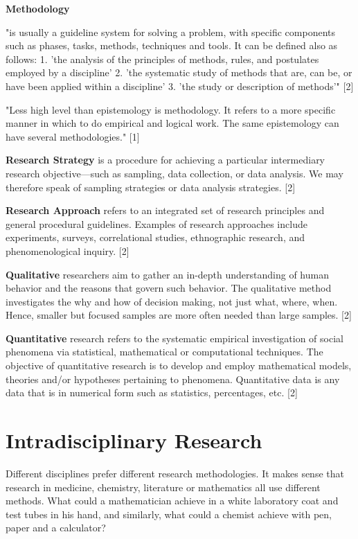 \textbf{Methodology}

"is usually a guideline system for solving a problem, with specific components such as phases, tasks, methods, techniques and tools. It can be defined also as follows: 1.	'the analysis of the principles of methods, rules, and postulates employed by a discipline' 2.	'the systematic study of methods that are, can be, or have been applied within a discipline' 3.	'the study or description of methods'" [2]

"Less high level than epistemology is methodology. It refers to a more specific manner in which to do empirical and logical work. The same epistemology can have several methodologies." [1]

\textbf{Research Strategy}
is a procedure for achieving a particular intermediary research objective—such as sampling, data collection, or data analysis. We may therefore speak of sampling strategies or data analysis strategies. [2]

\textbf{Research Approach}
refers to an integrated set of research principles and general procedural guidelines. Examples of research approaches include experiments, surveys, correlational studies, ethnographic research, and phenomenological inquiry. [2]

\textbf{Qualitative}
researchers aim to gather an in-depth understanding of human behavior and the reasons that govern such behavior. The qualitative method investigates the why and how of decision making, not just what, where, when. Hence, smaller but focused samples are more often needed than large samples. [2]

\textbf{Quantitative}
research refers to the systematic empirical investigation of social phenomena via statistical, mathematical or computational techniques. The objective of quantitative research is to develop and employ mathematical models, theories and/or hypotheses pertaining to phenomena. Quantitative data is any data that is in numerical form such as statistics, percentages, etc. [2]


\section{Intradisciplinary Research}

Different disciplines prefer different research methodologies. It makes sense that research in medicine, chemistry, literature or mathematics all use different methods. What could a mathematician achieve in a white laboratory coat and test tubes in his hand, and similarly, what could a chemist achieve with pen, paper and a calculator?

